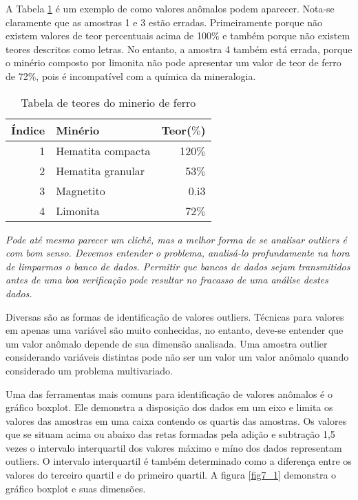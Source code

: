  A Tabela \ref{Tabela1:Minerio_de_ferro} é um exemplo de como valores anômalos podem aparecer. Nota-se claramente que as amostras 1 e 3 estão erradas. Primeiramente porque não existem valores de teor percentuais acima de 100$\%$ e também porque não existem teores descritos como letras. No entanto, a amostra 4 também está errada, porque o minério composto por limonita não pode apresentar um valor de teor de ferro de 72$\%$, pois é incompatível com a  química da mineralogia. 

\FloatBarrier
\begin{table}[!htb]
\centering
\caption{Tabela de teores do minerio de ferro}
\vspace{0.5cm}
\label{Tabela1:Minerio_de_ferro}
\begin{tabular}{r|lr}
	Índice & Minério & Teor($\%$) \\ 
	\hline                               
	1 & Hematita compacta       & 120$\%$ \\
	2 & Hematita granular       & 53$\%$ \\
	3 & Magnetito               & 0.i3 \\
	4 & Limonita                & 72$\%$ \\
\end{tabular}
\end{table}
\FloatBarrier

\begin{proposition}
	\textit{Pode até mesmo parecer um clichê, mas a melhor forma de se analisar outliers é com bom senso. Devemos entender o problema, analisá-lo profundamente na hora de limparmos o banco de dados. Permitir que bancos de dados sejam transmitidos antes de uma boa verificação pode resultar no fracasso de uma análise destes dados.}
\end{proposition}

Diversas são as formas de identificação de valores outliers. Técnicas para valores em apenas uma variável são muito conhecidas, no entanto, deve-se entender que um valor anômalo depende de sua dimensão analisada. Uma amostra outlier considerando variáveis distintas pode não ser um valor um valor anômalo quando considerado um problema multivariado. 

Uma das ferramentas mais comuns para identificação de valores anômalos é o gráfico boxplot. Ele demonstra a disposição dos dados em um eixo e limita os valores das amostras em uma caixa contendo os quartis das amostras. Os valores que se situam acima ou abaixo das retas formadas pela adição e subtração 1,5 vezes o intervalo interquartil dos valores máximo e míno dos dados representam outliers. O intervalo interquartil é também determinado como a diferença entre os valores do terceiro quartil e do primeiro quartil. A figura \ref{fig7_1} demonstra o gráfico boxplot e suas dimensões. 

